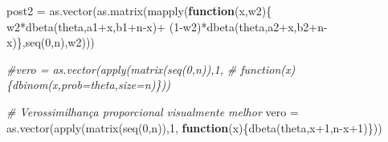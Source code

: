 \documentclass[
]{book}
\newenvironment{Shaded}{\begin{snugshade}}{\end{snugshade}}
\newcommand{\CommentTok}[1]{\textcolor[rgb]{0.56,0.35,0.01}{\textit{#1}}}
\newcommand{\ControlFlowTok}[1]{\textcolor[rgb]{0.13,0.29,0.53}{\textbf{#1}}}
\newcommand{\DecValTok}[1]{\textcolor[rgb]{0.00,0.00,0.81}{#1}}
\newcommand{\FunctionTok}[1]{\textcolor[rgb]{0.00,0.00,0.00}{#1}}
\newcommand{\NormalTok}[1]{#1}
\newcommand{\OtherTok}[1]{\textcolor[rgb]{0.56,0.35,0.01}{#1}}
\newcommand{\SpecialCharTok}[1]{\textcolor[rgb]{0.00,0.00,0.00}{#1}}
\begin{document}
\begin{Shaded}
\begin{Highlighting}[]
\NormalTok{post2 }\OtherTok{=} \FunctionTok{as.vector}\NormalTok{(}\FunctionTok{as.matrix}\NormalTok{(}\FunctionTok{mapply}\NormalTok{(}\ControlFlowTok{function}\NormalTok{(x,w2)\{}
\NormalTok{  w2}\SpecialCharTok{*}\FunctionTok{dbeta}\NormalTok{(theta,a1}\SpecialCharTok{+}\NormalTok{x,b1}\SpecialCharTok{+}\NormalTok{n}\SpecialCharTok{{-}}\NormalTok{x)}\SpecialCharTok{+}
\NormalTok{  (}\DecValTok{1}\SpecialCharTok{{-}}\NormalTok{w2)}\SpecialCharTok{*}\FunctionTok{dbeta}\NormalTok{(theta,a2}\SpecialCharTok{+}\NormalTok{x,b2}\SpecialCharTok{+}\NormalTok{n}\SpecialCharTok{{-}}\NormalTok{x)\},}\FunctionTok{seq}\NormalTok{(}\DecValTok{0}\NormalTok{,n),w2)))}
   
\CommentTok{\#vero = as.vector(apply(matrix(seq(0,n)),1,}
\CommentTok{\# function(x)\{dbinom(x,prob=theta,size=n)\}))}

\CommentTok{\# Verossimilhança proporcional visualmente melhor}
\NormalTok{vero }\OtherTok{=} \FunctionTok{as.vector}\NormalTok{(}\FunctionTok{apply}\NormalTok{(}\FunctionTok{matrix}\NormalTok{(}\FunctionTok{seq}\NormalTok{(}\DecValTok{0}\NormalTok{,n)),}\DecValTok{1}\NormalTok{,}
  \ControlFlowTok{function}\NormalTok{(x)\{}\FunctionTok{dbeta}\NormalTok{(theta,x}\SpecialCharTok{+}\DecValTok{1}\NormalTok{,n}\SpecialCharTok{{-}}\NormalTok{x}\SpecialCharTok{+}\DecValTok{1}\NormalTok{)\}))}


\end{Highlighting}
\end{Shaded}
\end{document}
